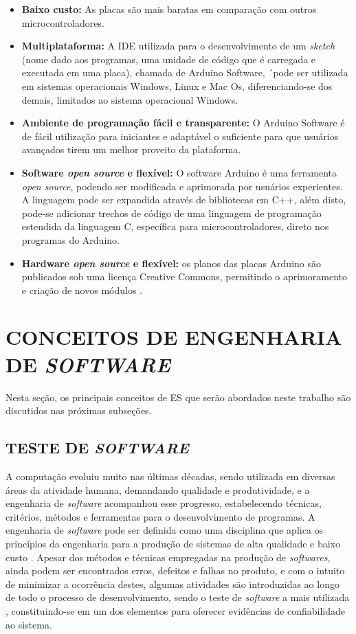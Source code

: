 \begin{itemize}
    \item \textbf{Baixo custo:} As placas são mais baratas em comparação com outros microcontroladores.
    \item \textbf{Multiplataforma:} A IDE utilizada para o desenvolvimento de um \textit{sketch} (nome dado aos programas, uma unidade de código que é carregada e executada em uma placa), chamada de Arduino Software, ´pode ser utilizada em sistemas operacionais Windows, Linux e Mac Os, diferenciando-se dos demais, limitados ao sistema operacional Windows.
    \item \textbf{ Ambiente de programação fácil e transparente:} O Arduino Software é de fácil utilização para iniciantes e adaptável o suficiente para que usuários avançados tirem um melhor proveito da plataforma.
    \item \textbf{Software \textit{open source} e flexível:} O software Arduino é uma ferramenta \textit{open source}, podendo ser modificada e aprimorada por usuários experientes. A linguagem pode ser expandida através de bibliotecas em C++, além disto, pode-se adicionar trechos de código de uma linguagem de programação estendida da linguagem C, específica para microcontroladores, direto nos programas do Arduino.
    
    \item \textbf{Hardware \textit{open source} e flexível:} os planos das placas Arduino são publicados sob uma licença Creative Commons, permitindo o aprimoramento e criação de novos módulos \cite{arduino2018}.
\end{itemize}


\section{CONCEITOS DE ENGENHARIA DE \textit{SOFTWARE}}
\label{sec:engenhariaDeSoftware}
Nesta seção, os principais conceitos de ES que serão abordados neste trabalho são discutidos nas próximas subseções.

\subsection{TESTE DE \textit{SOFTWARE}}
\label{subsec:testeDeSoftware} A computação evoluiu muito nas últimas décadas, sendo utilizada em diversas áreas da atividade humana, demandando qualidade e produtividade, e a engenharia de \textit{software} acompanhou esse progresso, estabelecendo técnicas, critérios, métodos e ferramentas para o desenvolvimento de programas. A engenharia de \textit{software} pode ser definida como uma disciplina que aplica os princípios da engenharia para a produção de sistemas de alta qualidade e baixo custo \cite{Pressman2011}. Apesar dos métodos e técnicas empregadas na produção de \textit{softwares}, ainda podem ser encontrados erros, defeitos e falhas no produto, e com o intuito de minimizar a ocorrência destes, algumas atividades são introduzidas ao longo de todo o processo de desenvolvimento, sendo o teste de \textit{software} a mais utilizada \cite{Maldonado1997}, constituindo-se em um dos elementos para oferecer evidências de confiabilidade ao sistema.

